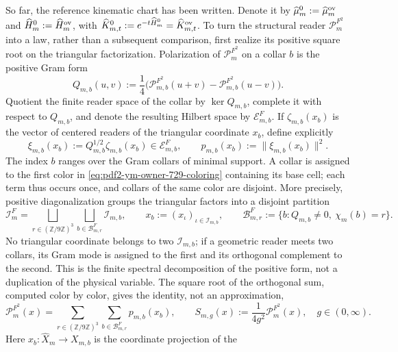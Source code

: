 So far, the reference kinematic chart has been written. Denote it by
$\widehat\mu_m^0:=\widehat\mu_m^{\rm ov}$ and
$\widehat H_m^0:=\widehat H_m^{\rm ov}$, with
$\widehat K_{m,t}^0:=e^{-t\widehat H_m^0}=\widehat K_{m,t}^{\rm ov}$.
To turn the structural reader
$\mathcal P_m^{F^2}$ into a law, rather than a subsequent comparison, first realize
its positive square root on the triangular factorization. Polarization of
$\mathcal P_m^{F^2}$ on a collar $b$ is the positive Gram form
\[
 Q_{m,b}(u,v):=\frac14\bigl(
 \mathcal P_{m,b}^{F^2}(u+v)-\mathcal P_{m,b}^{F^2}(u-v)
 \bigr).
\]
Quotient the finite reader space of the collar by $\ker Q_{m,b}$, complete it
with respect to $Q_{m,b}$, and denote the resulting Hilbert space by $\mathcal E_{m,b}^{F}$. If
$\zeta_{m,b}(x_b)$ is the vector of centered readers of the triangular coordinate
$x_b$, define explicitly
\begin{equation}\label{eq:pdf2-ym-action-root}
 \xi_{m,b}(x_b):=Q_{m,b}^{1/2}\zeta_{m,b}(x_b)
 \in\mathcal E_{m,b}^{F},
 \qquad
 p_{m,b}(x_b):=\|\xi_{m,b}(x_b)\|^2.
\end{equation}
The index $b$ ranges over the Gram collars of minimal support. A collar is assigned
to the first color in \eqref{eq:pdf2-ym-owner-729-coloring} containing its base cell;
each term thus occurs once, and collars of the same color are disjoint.
More precisely, positive diagonalization groups the triangular factors into
a disjoint partition
\begin{equation}\label{eq:pdf2-ym-action-factor-partition}
 \mathcal I_m^{F}
 =\bigsqcup_{r\in(\mathbb Z/9\mathbb Z)^3}
   \bigsqcup_{b\in\mathcal B_{m,r}^{F}}\mathcal I_{m,b},
 \qquad x_b:=(x_\iota)_{\iota\in\mathcal I_{m,b}},
 \qquad
 \mathcal B_{m,r}^{F}:=\{b:Q_{m,b}\ne0,\ \chi_m(b)=r\}.
\end{equation}
No triangular coordinate belongs to two $\mathcal I_{m,b}$; if a geometric
reader meets two collars, its Gram mode is assigned to the first and its orthogonal
complement to the second. This is the finite spectral decomposition of the positive form,
not a duplication of the physical variable.
The square root of the orthogonal sum, computed color by color, gives the identity, not an
approximation,
\begin{equation}\label{eq:pdf2-ym-action-reader-sum}
 \mathcal P_m^{F^2}(x)
 =\sum_{r\in(\mathbb Z/9\mathbb Z)^3}
   \sum_{b\in\mathcal B_{m,r}^{F}}p_{m,b}(x_b),
 \qquad
 S_{m,g}(x):=\frac1{4g^2}\mathcal P_m^{F^2}(x),
 \quad g\in(0,\infty).
\end{equation}
Here $x_b:\widehat X_m\to X_{m,b}$ is the coordinate projection of the
